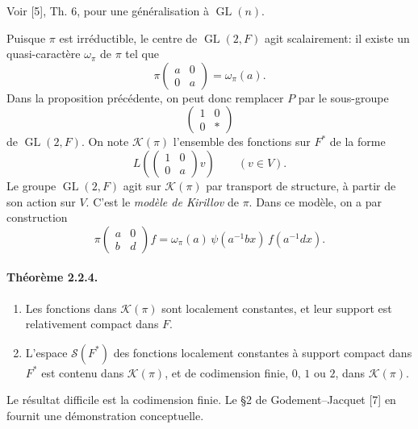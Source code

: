 \documentclass[10pt,a4paper]{article}
\providecommand{\GL}{\operatorname{GL}}
\providecommand{\calK}{\mathcal K}
\begin{document}
Voir [5], Th. 6, pour une généralisation à \(\GL(n)\).

\clearpage
{}
\hypertarget{authority-26}{}
Puisque \(\pi\) est irréductible, le centre de \(\GL(2,F)\) agit scalairement: il existe un quasi-caractère \(\omega_\pi\) de \(\pi\) tel que
\[
\pi\begin{pmatrix}a&0\\0&a\end{pmatrix}=\omega_\pi(a).
\]
Dans la proposition précédente, on peut donc remplacer \(P\) par le sous-groupe
\[
\begin{pmatrix}1&0\\0&*\end{pmatrix}
\]
de \(\GL(2,F)\). On note \(\calK(\pi)\) l'ensemble des fonctions sur \(F^*\) de la forme
\[
L\!\left(\begin{pmatrix}1&0\\0&a\end{pmatrix}v\right)\qquad (v\in V).
\]
Le groupe \(\GL(2,F)\) agit sur \(\calK(\pi)\) par transport de structure, à partir de son action sur \(V\). C'est le \emph{modèle de Kirillov} de \(\pi\). Dans ce modèle, on a par construction
\[
\tag{2.2.3.1}
\pi\begin{pmatrix}a&0\\b&d\end{pmatrix}f
=
\omega_\pi(a)\,\psi(a^{-1}bx)\,f(a^{-1}dx).
\]

\paragraph{Théorème 2.2.4.}{\itshape 
\begin{enumerate}[label=(\roman*)]
\item Les fonctions dans \(\calK(\pi)\) sont localement constantes, et leur support est relativement compact dans \(F\).
\item L'espace \(\mathcal S(F^*)\) des fonctions localement constantes à support compact dans \(F^*\) est contenu dans \(\calK(\pi)\), et de codimension finie, \(0\), \(1\) ou \(2\), dans \(\calK(\pi)\).
\end{enumerate}
\par}
Le résultat difficile est la codimension finie. Le §2 de Godement--Jacquet [7] en fournit une démonstration conceptuelle.
\end{document}
